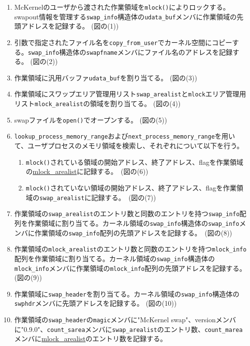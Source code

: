 \documentclass[twoside,11pt,fleqn]{book}
\newcommand\textttw[1]{\mathchardef\UrlBreakPenalty=100\mathchardef\UrlBigBreakPenalty=100\url{#1}}
\begin{document}
\begin{enumerate}
\item McKernelのユーザから渡された作業領域を\texttt{mlock()}によりロックする。swapout情報を管理する\texttt{swap\_info}構造体の\texttt{udata\_buf}メンバに作業領域の先頭アドレスを記録する。 (図の(1))
\item 引数で指定されたファイル名を\texttt{copy\_from\_user}でカーネル空間にコピーする。\texttt{swap\_info}構造体の\texttt{swapfname}メンバにファイル名のアドレスを記録する。 (図の(2))
\item 作業領域に汎用バッファ\texttt{udata\_buf}を割り当てる。 (図の(3))
\item 作業領域にスワップエリア管理用リスト\texttt{swap\_arealist}と\texttt{mlock}エリア管理用リスト\texttt{mlock\_arealist}の領域を割り当てる。 (図の(4))
\item swapファイルを\texttt{open()}でオープンする。 (図の(5))
\item \texttt{lookup\_process\_memory\_range}および\texttt{next\_process\_memory\_range}を用いて、ユーザプロセスのメモリ領域を検索し、それぞれについて以下を行う。
\begin{enumerate}
\item \texttt{mlock()}されている領域の開始アドレス、終了アドレス、flagを作業領域の\textttw{mlock\_arealist}に記録する。　(図の(6))
\item \texttt{mlock()}されていない領域の開始アドレス、終了アドレス、flagを作業領域の\texttt{swap\_arealist}に記録する。　(図の(7))
\end{enumerate}
\item 作業領域の\texttt{swap\_arealist}のエントリ数と同数のエントリを持つ\texttt{swap\_info}配列を作業領域に割り当てる。カーネル領域の\texttt{swap\_info}構造体の\texttt{swap\_info}メンバに作業領域の\texttt{swap\_info}配列の先頭アドレスを記録する。　(図の(8))
\item 作業領域の\texttt{mlock\_arealist}のエントリ数と同数のエントリを持つ\texttt{mlock\_info}配列を作業領域に割り当てる。カーネル領域の\texttt{swap\_info}構造体の\texttt{mlock\_info}メンバに作業領域の\texttt{mlock\_info}配列の先頭アドレスを記録する。　(図の(9))
\item 作業領域に\texttt{swap\_header}を割り当てる。カーネル領域の\texttt{swap\_info}構造体の\texttt{swphdr}メンバに先頭アドレスを記録する。 (図の(10))
\item 作業領域の\texttt{swap\_header}の\texttt{magic}メンバに"McKernel swap"、versionメンバに"0.9.0"、\texttt{count\_sarea}メンバに\texttt{swap\_arealist}のエントリ数、\texttt{count\_marea}メンバに\textttw{mlock\_arealist}のエントリ数を記録する。

\end{enumerate}
\end{document}
